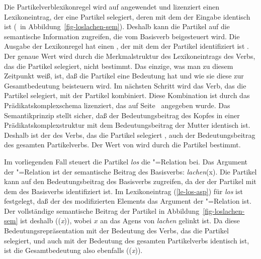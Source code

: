Die Partikelverblexikonregel wird auf  angewendet und
lizenziert einen Lexikoneintrag, der eine Partikel selegiert,
deren \modw mit dem \synsemw der Eingabe identisch ist
(\, in Abbildung~\ref{fig-loslachen-sem}). Deshalb kann die Partikel
auf die semantische Information zugreifen, die vom Basisverb beigesteuert
wird. Die Ausgabe der Lexikonregel hat einen \contw, der
mit dem \contw der Partikel identifiziert ist . Der genaue
Wert wird durch die Merkmalstruktur des Lexikoneintrags des Verbs,
das die Partikel selegiert, nicht bestimmt. Das einzige, was man zu diesem
Zeitpunkt weiß, ist, daß die Partikel eine Bedeutung hat und wie
sie diese zur Gesamtbedeutung beisteuern wird. Im nächsten Schritt
wird das Verb, das die Partikel selegiert, mit der Partikel kombiniert.
Diese Kombination ist durch das Prädikatskomplexschema lizenziert,
das auf Seite~\pageref{schema-vk} angegeben wurde.
Das Semantikprinzip stellt sicher, daß der Bedeutungsbeitrag des Kopfes
in einer Prädikatskomplexstruktur mit dem Bedeutungsbeitrag der Mutter identisch
ist. Deshalb ist der \contw des Verbs, das die Partikel selegiert , 
auch der Bedeutungsbeitrag des gesamten Partikelverbs.
Der Wert von  wird durch die Partikel bestimmt.

Im vorliegenden Fall steuert die Partikel \emph{los} die "=Relation bei.
Das Argument der "=Relation ist der semantische Beitrag des Basisverbs:
\emph{lachen}(x). Die Partikel kann auf den Bedeutungsbeitrag
des Basisverbs zugreifen, da der \modw der Partikel mit dem \synsemw des Basisverbs 
identifiziert ist. Im Lexikoneintrag (\ref{le-los-asp}) für \emph{los} ist festgelegt,
daß der \contw des modifizierten Elements das Argument der "=Relation ist.
Der vollständige semantische Beitrag der Partikel in Abbildung~\ref{fig-loslachen-sem} 
ist deshalb ((\emph{x})), wobei $x$ an das Agens von \emph{lachen} gelinkt ist.
Da diese Bedeutungsrepräsentation mit der Bedeutung des Verbs, das die Partikel selegiert,
und auch mit der Bedeutung des gesamten Partikelverbs identisch ist, ist die Gesamtbedeutung
also ebenfalls ((\emph{x})).

